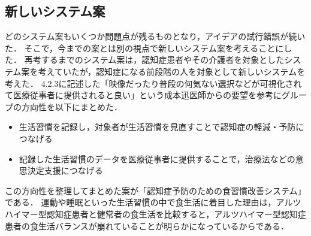 \documentclass[../report]{subfiles}
\begin{document}
\subsection{新しいシステム案}
どのシステム案もいくつか問題点が残るものとなり，アイデアの試行錯誤が続いた．
そこで，今までの案とは別の視点で新しいシステム案を考えることにした．
再考するまでのシステム案は，認知症患者やその介護者を対象としたシステム案を考えていたが，認知症になる前段階の人を対象として新しいシステムを考えた．
4.2.3に記述した「映像だったり普段の何気ない選択などが可視化されて医療従事者に提供されると良い」という成本迅医師からの要望を参考にグループの方向性を以下にまとめた．

\begin{itemize}
    \item 生活習慣を記録し，対象者が生活習慣を見直すことで認知症の軽減・予防につなげる
    \item 記録した生活習慣のデータを医療従事者に提供することで，治療法などの意思決定支援につなげる
\end{itemize}

この方向性を整理してまとめた案が「認知症予防のための食習慣改善システム」である．
運動や睡眠といった生活習慣の中で食生活に着目した理由は，アルツハイマー型認知症患者と健常者の食生活を比較すると，アルツハイマー型認知症患者の食生活バランスが崩れている\cite{dementia-nutrition}ことが明らかになっているからである．

\end{document}
